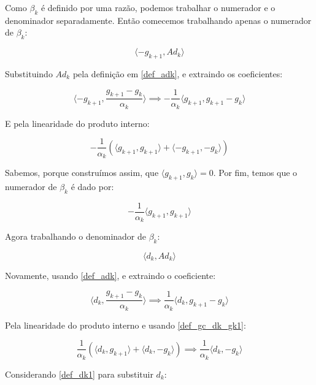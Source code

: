 Como \(\beta_k\) é definido por uma razão, podemos trabalhar o numerador e o denominador
separadamente. Então comecemos trabalhando apenas o numerador de \(\beta_k\):

\begin{equation}
\langle -g_{k+1}, Ad_k \rangle
\end{equation}

Substituindo \(Ad_k\) pela definição em \ref{def_adk}, e extraindo os coeficientes:

\begin{equation}
\langle -g_{k+1}, \frac{g_{k+1} - g_k}{\alpha_k} \rangle \implies -\frac{1}{\alpha_k} \langle g_{k+1}, g_{k+1} - g_k \rangle
\end{equation}

E pela linearidade do produto interno:

\begin{equation}
-\frac{1}{\alpha_k}(\langle g_{k+1}, g_{k+1} \rangle + \langle -g_{k+1}, - g_k \rangle)
\end{equation}


Sabemos, porque construímos assim, que \(\langle g_{k+1}, g_k \rangle = 0\). Por fim, temos que o
numerador de \(\beta_k\) é dado por:

\begin{equation}
\label{def_gc_numerador}  
-\frac{1}{\alpha_k} \langle g_{k+1}, g_{k+1} \rangle
\end{equation}

Agora trabalhando o denominador de \(\beta_k\):

\begin{equation}
\langle d_k, Ad_k \rangle
\end{equation}


Novamente, usando \ref{def_adk}, e extraindo o coeficiente:

\begin{equation}
\langle d_k, \frac{g_{k+1} - g_k}{\alpha_k} \rangle \implies \frac{1}{\alpha_k}\langle d_k, g_{k+1} - g_k \rangle
\end{equation}

Pela linearidade do produto interno e usando \ref{def_gc_dk_gk1}:

\begin{equation*}
\frac{1}{\alpha_k} (\langle d_k, g_{k+1} \rangle + \langle d_k, - g_k \rangle) \implies \frac{1}{\alpha_k} \langle d_k, - g_k \rangle
\end{equation*}

Considerando \ref{def_dk1} para substituir \(d_k\):

